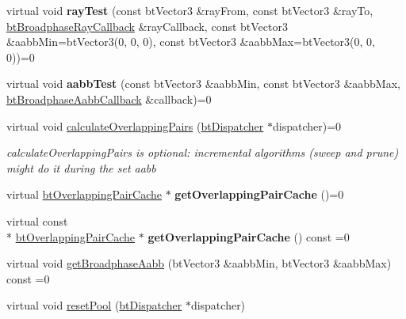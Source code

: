 \begin{DoxyCompactItemize}
\item 
\hypertarget{classbt_broadphase_interface_a516bf7f981dc4540c32c67820de64e0c}{virtual void {\bfseries ray\+Test} (const bt\+Vector3 \&ray\+From, const bt\+Vector3 \&ray\+To, \hyperlink{structbt_broadphase_ray_callback}{bt\+Broadphase\+Ray\+Callback} \&ray\+Callback, const bt\+Vector3 \&aabb\+Min=bt\+Vector3(0, 0, 0), const bt\+Vector3 \&aabb\+Max=bt\+Vector3(0, 0, 0))=0}\label{classbt_broadphase_interface_a516bf7f981dc4540c32c67820de64e0c}

\item 
\hypertarget{classbt_broadphase_interface_a19d8d870968460c4a191937a3bb8ecc4}{virtual void {\bfseries aabb\+Test} (const bt\+Vector3 \&aabb\+Min, const bt\+Vector3 \&aabb\+Max, \hyperlink{structbt_broadphase_aabb_callback}{bt\+Broadphase\+Aabb\+Callback} \&callback)=0}\label{classbt_broadphase_interface_a19d8d870968460c4a191937a3bb8ecc4}

\item 
\hypertarget{classbt_broadphase_interface_a27e29cb6fd31e5fe626e7ba973e67ddb}{virtual void \hyperlink{classbt_broadphase_interface_a27e29cb6fd31e5fe626e7ba973e67ddb}{calculate\+Overlapping\+Pairs} (\hyperlink{classbt_dispatcher}{bt\+Dispatcher} $\ast$dispatcher)=0}\label{classbt_broadphase_interface_a27e29cb6fd31e5fe626e7ba973e67ddb}

\begin{DoxyCompactList}\small\item\em calculate\+Overlapping\+Pairs is optional\+: incremental algorithms (sweep and prune) might do it during the set aabb \end{DoxyCompactList}\item 
\hypertarget{classbt_broadphase_interface_ab571b271322bd5a114fe737b30df5b52}{virtual \hyperlink{classbt_overlapping_pair_cache}{bt\+Overlapping\+Pair\+Cache} $\ast$ {\bfseries get\+Overlapping\+Pair\+Cache} ()=0}\label{classbt_broadphase_interface_ab571b271322bd5a114fe737b30df5b52}

\item 
\hypertarget{classbt_broadphase_interface_a80c39996491df3b0a5bf927d5837c966}{virtual const \\*
\hyperlink{classbt_overlapping_pair_cache}{bt\+Overlapping\+Pair\+Cache} $\ast$ {\bfseries get\+Overlapping\+Pair\+Cache} () const =0}\label{classbt_broadphase_interface_a80c39996491df3b0a5bf927d5837c966}

\item 
virtual void \hyperlink{classbt_broadphase_interface_ab5af9e26414f5a72a76040b8fab4d9e2}{get\+Broadphase\+Aabb} (bt\+Vector3 \&aabb\+Min, bt\+Vector3 \&aabb\+Max) const =0
\item 
\hypertarget{classbt_broadphase_interface_a8135b10b29bced0b1c62ba6be060dc29}{virtual void \hyperlink{classbt_broadphase_interface_a8135b10b29bced0b1c62ba6be060dc29}{reset\+Pool} (\hyperlink{classbt_dispatcher}{bt\+Dispatcher} $\ast$dispatcher)}\label{classbt_broadphase_interface_a8135b10b29bced0b1c62ba6be060dc29}


\end{DoxyCompactItemize}
